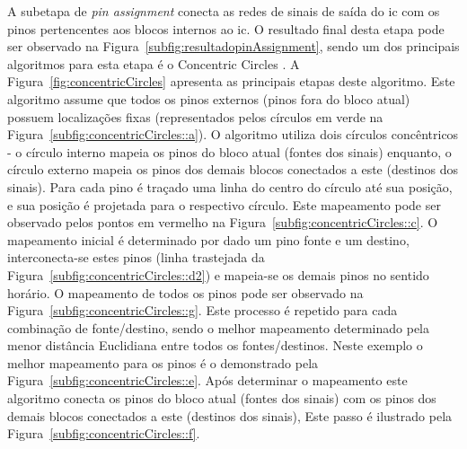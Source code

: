 A subetapa de \textit{pin assignment} conecta as redes de sinais de saída do \ac{ic} com os pinos pertencentes aos blocos internos ao \ac{ic}.
O resultado final desta etapa pode ser observado na Figura~\ref{subfig:resultadopinAssignment}, sendo um dos principais algoritmos para esta etapa é o Concentric Circles \cite{koren1972pin, brady1984approach}.
A Figura~\ref{fig:concentricCircles} apresenta as principais etapas deste algoritmo.
Este algoritmo assume que todos os pinos externos (pinos fora do bloco atual) possuem localizações fixas (representados pelos círculos em verde na Figura~\ref{subfig:concentricCircles::a}). 
O algoritmo utiliza dois círculos concêntricos - o círculo interno mapeia os pinos do bloco atual (fontes dos sinais) enquanto, o círculo externo mapeia os pinos dos demais blocos conectados a este (destinos dos sinais).
Para cada pino é traçado uma linha do centro do círculo até sua posição, e sua posição é projetada para o respectivo círculo.
Este mapeamento pode ser observado pelos pontos em vermelho na Figura~\ref{subfig:concentricCircles::c}.
O mapeamento inicial é determinado por dado um pino fonte e um destino, interconecta-se estes pinos (linha trastejada da Figura~\ref{subfig:concentricCircles::d2}) e mapeia-se os demais pinos no sentido horário.
O mapeamento de todos os pinos pode ser observado na Figura~\ref{subfig:concentricCircles::g}.
Este processo é repetido para cada combinação de fonte/destino, sendo o melhor mapeamento determinado pela menor distância Euclidiana entre todos os fontes/destinos.
Neste exemplo o melhor mapeamento para os pinos é o demonstrado pela Figura~\ref{subfig:concentricCircles::e}.
Após determinar o mapeamento este algoritmo conecta os pinos do bloco atual (fontes dos sinais) com os pinos dos demais blocos conectados a este (destinos dos sinais), Este passo é ilustrado pela Figura~\ref{subfig:concentricCircles::f}.

